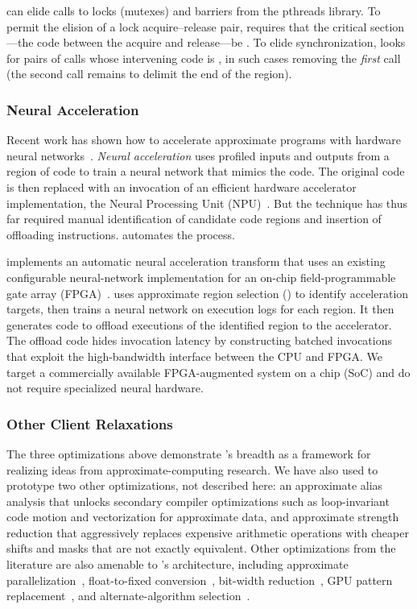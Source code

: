 \sysname can elide calls to locks (mutexes) and
barriers from the pthreads library.
To permit the elision of a lock
acquire--release pair, \sysname requires that the critical section---the code
between the acquire and release---be \precisepure.
To elide
 synchronization, \sysname looks for pairs of calls
whose intervening code is \precisepure, in such cases removing the \emph{first}
call (the second call remains to delimit the end of the region).

\subsubsection{Neural Acceleration}
\label{accept:sec:npu}

Recent work has shown how to accelerate approximate programs with hardware
neural networks~\cite{benchnn, temam-isca, temam-isca13}.
\textit{Neural acceleration} uses profiled inputs and outputs from a region of
code to train a neural network that mimics the code.
The original code is then replaced with an invocation of an
efficient hardware accelerator implementation, the Neural Processing Unit
(NPU)~\cite{npu, anpu, snnap}.
But the technique has thus far required manual identification of candidate
code regions and insertion of offloading instructions.
\sysname automates the process.

\sysname implements an automatic neural acceleration transform
that uses an existing configurable neural-network implementation
for an on-chip field-programmable gate array (FPGA)~\cite{snnap}.
\sysname uses approximate region selection () to
identify acceleration targets, then trains a neural network on
execution logs for each region.
It then generates code to offload executions of the identified region to the
accelerator.
The offload code hides invocation latency by constructing batched invocations
that exploit the high-bandwidth interface between the CPU and FPGA.
We target a commercially available FPGA-augmented system on a chip (SoC) and
do not require specialized neural hardware.

\subsubsection{Other Client Relaxations}
The three optimizations above demonstrate \sysname's breadth as a
framework for realizing ideas from approximate-computing research.
We have also used \sysname to prototype
two other optimizations, not described here:
an approximate alias analysis that unlocks secondary compiler optimizations such as
loop-invariant code motion and vectorization for approximate data, and
approximate strength reduction that aggressively replaces expensive arithmetic
operations with cheaper shifts and masks that are not exactly equivalent.
Other optimizations from the literature are also amenable to \sysname's
architecture, including approximate parallelization~\cite{quickstep},
float-to-fixed conversion~\cite{torftf},
bit-width reduction~\cite{bitwidthred, precimonious}, GPU pattern replacement~\cite{paraprox},
and alternate-algorithm selection~\cite{green, petabricks}.
